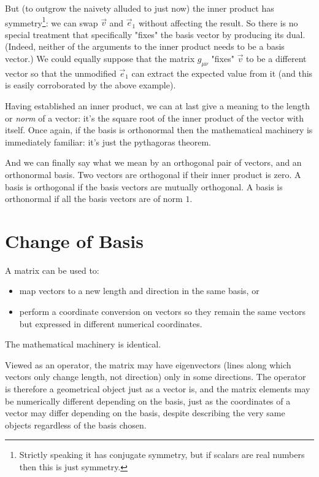 But (to outgrow the naivety alluded to just now) the inner product has symmetry\footnote{Strictly speaking it has conjugate symmetry, but if scalars are real numbers then this is just symmetry.}: we can swap $\vec{v}$ and $\vec{e}_1$ without affecting the result. So there is no special treatment that specifically "fixes" the basis vector by producing its dual. (Indeed, neither of the arguments to the inner product needs to be a basis vector.) We could equally suppose that the matrix $g_{\mu\nu}$ "fixes" $\vec{v}$ to be a different vector so that the unmodified $\vec{e}_1$ can extract the expected value from it (and this is easily corroborated by the above example).

Having established an inner product, we can at last give a meaning to the length or \textit{norm} of a vector: it's the square root of the inner product of the vector with itself. Once again, if the basis is orthonormal then the mathematical machinery is immediately familiar: it's just the pythagoras theorem.

And we can finally say what we mean by an orthogonal pair of vectors, and an orthonormal basis. Two vectors are orthogonal if their inner product is zero. A basis is orthogonal if the basis vectors are mutually orthogonal. A basis is orthonormal if all the basis vectors are of norm $1$.

\section{Change of Basis}\label{sec:vectors-change-basis}

A matrix can be used to:

\begin{itemize}
    \item map vectors to a new length and direction in the same basis, or
    \item perform a coordinate conversion on vectors so they remain the same vectors but expressed in different numerical coordinates.
\end{itemize}

The mathematical machinery is identical.

Viewed as an operator, the matrix may have eigenvectors (lines along which vectors only change length, not direction) only in some directions. The operator is therefore a geometrical object just as a vector is, and the matrix elements may be numerically different depending on the basis, just as the coordinates of a vector may differ depending on the basis, despite describing the very same objects regardless of the basis chosen.

